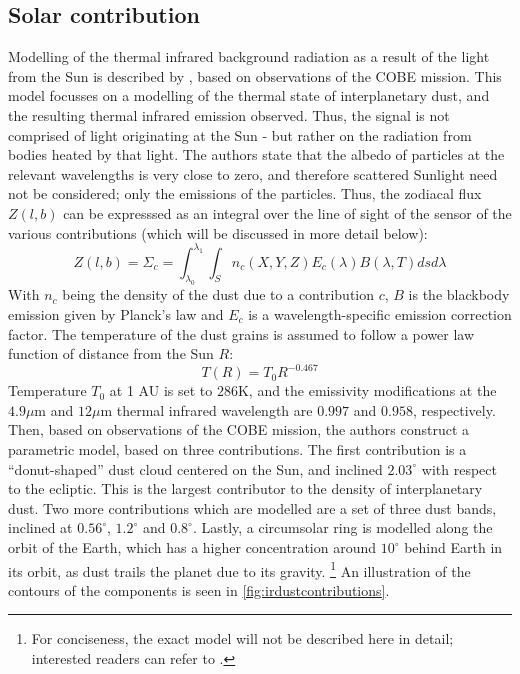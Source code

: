 \subsection{Solar contribution}
Modelling of the thermal infrared background radiation as a result of the light from the Sun is described by \cite{IRDust}, based on observations of the COBE mission. This model focusses on a modelling of the thermal state of interplanetary dust, and the resulting thermal infrared emission observed. Thus, the signal is not comprised of light originating at the Sun - but rather on the radiation from bodies heated by that light. The authors state that the albedo of particles at the relevant wavelengths is very close to zero, and therefore scattered Sunlight need not be considered; only the emissions of the particles. Thus, the zodiacal flux $Z(l, b)$ can be expresssed as an integral over the line of sight of the sensor of the various contributions (which will be discussed in  more detail below):
\begin{equation}
 Z(l, b) = \Sigma_c = \int _{\lambda_0} ^{\lambda_1} \int _S n_{c}(X, Y, Z)  E_{c}(\lambda) B(\lambda, T) ds d\lambda
 \label{eq:irdustflux}
\end{equation}
With $n_c$ being the density of the dust due to a contribution $c$, $B$ is the blackbody emission given by Planck's law and $E_c$ is a wavelength-specific emission correction factor. The temperature of the dust grains is assumed to follow a power law function of distance from the Sun $R$:
\begin{equation}
 T(R) = T_0R^{-0.467}
\end{equation}
Temperature $T_0$ at 1 AU is set to $286 \mathrm{K}$, and the emissivity modifications at the $4.9 \mu\mathrm{m}$ and $12 \mu\mathrm{m}$ thermal infrared wavelength are $0.997$ and $0.958$, respectively. Then, based on observations of the COBE mission, the authors construct a parametric model, based on three contributions. The first contribution is a ``donut-shaped'' dust cloud centered on the Sun, and inclined $2.03^\circ$ with respect to the ecliptic. This is the largest contributor to the density of interplanetary dust. Two more contributions which are modelled are a set of three dust bands, inclined at $0.56^\circ$, $1.2^\circ$ and $0.8^\circ$. Lastly, a circumsolar ring is modelled along the orbit of the Earth, which has a higher concentration around $10^\circ$ behind Earth in its orbit, as dust trails the planet due to its gravity. \footnote{For conciseness, the exact model will not be described here in detail; interested readers can refer to \cite{IRDust}.} An illustration of the contours of the components is seen in \autoref{fig:irdustcontributions}.\\

